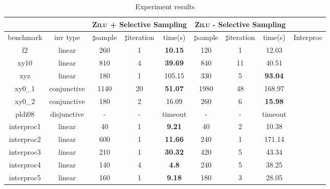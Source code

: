 \begin{table}[t]
\scriptsize
\centering
\caption{Experiment results}
\begin{tabular}{l c | c c c | c c c | c }
\cline{3-8}
& &\multicolumn{3}{|c|}{\textsc{Zilu} + Selective Sampling}&\multicolumn{3}{c|}{\textsc{Zilu} - Selective Sampling} & \\
\hline
\multicolumn{1}{|c|}{benchmark}&\multicolumn{1}{|c|}{inv type}& $\sharp$sample & $\sharp$iteration & time(s) & $\sharp$sample & $\sharp$iteration &time(s) & \multicolumn{1}{|c|}{Interproc} \\
\hline %
\multicolumn{1}{|c|}{f2}         						&linear 		&260 &1 &\textbf{10.15}  		&120 &1   &12.03  			&\multicolumn{1}{|c|}{\cmark} \\
\multicolumn{1}{|c|}{xy10} 	        					&linear 		&810 &4 &\textbf{39.69} 		&840  &11  &40.51  			&\multicolumn{1}{|c|}{\cmark} \\
\multicolumn{1}{|c|}{xyz}   	      					&linear 		&180 &1 &105.15  				&330  &5  &\textbf{93.04}  	&\multicolumn{1}{|c|}{\cmark} \\
\multicolumn{1}{|c|}{xy0\_1}         					&conjunctive 	&1140 &20 &\textbf{51.07}		&1980 &48 &168.97  			&\multicolumn{1}{|c|}{\cmark} \\
\multicolumn{1}{|c|}{xy0\_2}         					&conjunctive 	&180  &2 &16.09					&260 &6 &\textbf{15.98}  	&\multicolumn{1}{|c|}{\cmark} \\
\multicolumn{1}{|c|}{pldi08} 		        			&disjunctive 	&- & - &timeout  				&-  &-  &timeout  		&\multicolumn{1}{|c|}{\xmark} \\

\multicolumn{1}{|c|}{interproc1}         				&linear 		&40 &1 &\textbf{9.21}  			&40 &2   &10.38  			&\multicolumn{1}{|c|}{\cmark} \\
\multicolumn{1}{|c|}{interproc2}         				&linear 		&600 &1 &\textbf{11.66} 		&240  &1  &171.14  			&\multicolumn{1}{|c|}{\cmark} \\
\multicolumn{1}{|c|}{interproc3}         				&linear 		&210 &1 &\textbf{30.32}  		&420 &5   &43.34  			&\multicolumn{1}{|c|}{\cmark} \\
\multicolumn{1}{|c|}{interproc4}         				&linear 		&140 &4 &\textbf{4.8}  			&240 &5   &38.25  			&\multicolumn{1}{|c|}{\xmark} \\
\multicolumn{1}{|c|}{interproc5}         				&linear 		&160 &1 &\textbf{9.18}  		&180 &3   &28.05  			&\multicolumn{1}{|c|}{\cmark} \\


\end{tabular}
\end{table}
